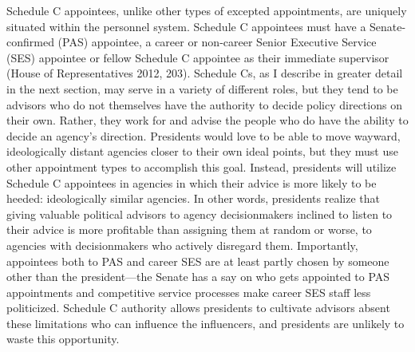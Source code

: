 \documentclass[12pt]{article}
\begin{document}
Schedule C appointees, unlike other types of excepted appointments, are uniquely situated within the personnel system. Schedule C appointees must have a Senate-confirmed (PAS) appointee, a career or non-career Senior Executive Service (SES) appointee or fellow Schedule C appointee as their immediate supervisor (House of Representatives 2012, 203). Schedule Cs, as I describe in greater detail in the next section, may serve in a variety of different roles, but they tend to be advisors who do not themselves have the authority to decide policy directions on their own. Rather, they work for and advise the people who do have the ability to decide an agency's direction. Presidents would love to be able to move wayward, ideologically distant agencies closer to their own ideal points, but they must use other appointment types to accomplish this goal. Instead, presidents will utilize Schedule C appointees in agencies in which their advice is more likely to be heeded: ideologically similar agencies. In other words, presidents realize that giving valuable political advisors to agency decisionmakers inclined to listen to their advice is more profitable than assigning them at random or worse, to agencies with decisionmakers who actively disregard them. Importantly, appointees both to PAS and career SES are at least partly chosen by someone other than the president---the Senate has a say on who gets appointed to PAS appointments and competitive service processes make career SES staff less politicized. Schedule C authority allows presidents to cultivate advisors absent these limitations who can influence the influencers, and presidents are unlikely to waste this opportunity.

\end{document}

